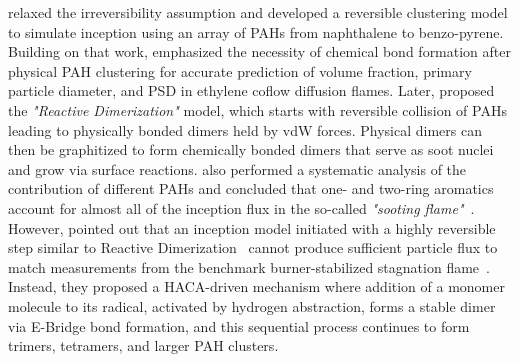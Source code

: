 \citet{eaves2015importance} relaxed the irreversibility assumption and developed a reversible clustering model to simulate inception using an array of PAHs from naphthalene to benzo-pyrene. Building on that work, \citet{kholghy2019role} emphasized the necessity of chemical bond formation after physical PAH clustering for accurate prediction of volume fraction, primary particle diameter, and PSD in ethylene coflow diffusion flames. Later, \citet{kholghy2018reactive} proposed the \textit{"Reactive Dimerization"} model, which starts with reversible collision of PAHs leading to physically bonded dimers held by vdW forces. Physical dimers can then be graphitized to form chemically bonded dimers that serve as soot nuclei and grow via surface reactions. \citet{kholghy2018reactive} also performed a systematic analysis of the contribution of different PAHs and concluded that one- and two-ring aromatics account for almost all of the inception flux in the so-called \textit{"sooting flame"}~\citep{desgroux2017comparative}. However, \citet{frenklach2020mechanism} pointed out that an inception model initiated with a highly reversible step similar to Reactive Dimerization~\citep{kholghy2018reactive} cannot produce sufficient particle flux to match measurements from the benchmark burner-stabilized stagnation flame~\citep{abid2009quantitative}. Instead, they proposed a HACA-driven mechanism where addition of a monomer molecule to its radical, activated by hydrogen abstraction, forms a stable dimer via E-Bridge bond formation, and this sequential process continues to form trimers, tetramers, and larger PAH clusters.


